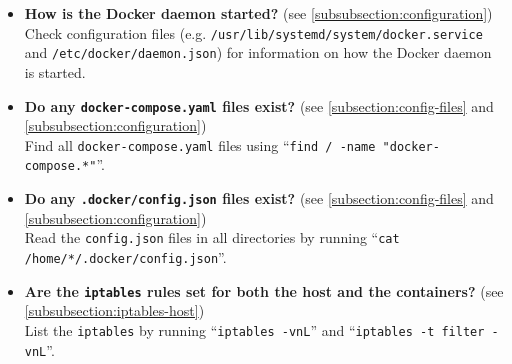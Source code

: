 \begin{itemize}
    \item \textbf{How is the Docker daemon started?} (see \autoref{subsubsection:configuration})\\
    Check configuration files (e.g. \lstinline{/usr/lib/systemd/system/docker.service} and \lstinline{/etc/docker/daemon.json}) for information on how the Docker daemon is started.

    \item \textbf{Do any \lstinline{docker-compose.yaml} files exist?} (see \autoref{subsection:config-files} and \autoref{subsubsection:configuration})\\
    Find all \lstinline{docker-compose.yaml} files using ``\lstinline{find / -name "docker-compose.*"}''.

    \item \textbf{Do any \lstinline{.docker/config.json} files exist?} (see \autoref{subsection:config-files} and \autoref{subsubsection:configuration})\\
    Read the \lstinline{config.json} files in all directories by running ``\lstinline{cat /home/*/.docker/config.json}''.

    \item \textbf{Are the \lstinline{iptables} rules set for both the host and the containers?} (see \autoref{subsubsection:iptables-host})\\
    List the \lstinline{iptables} by running ``\lstinline{iptables -vnL}'' and ``\lstinline{iptables -t filter -vnL}''.
\end{itemize}
